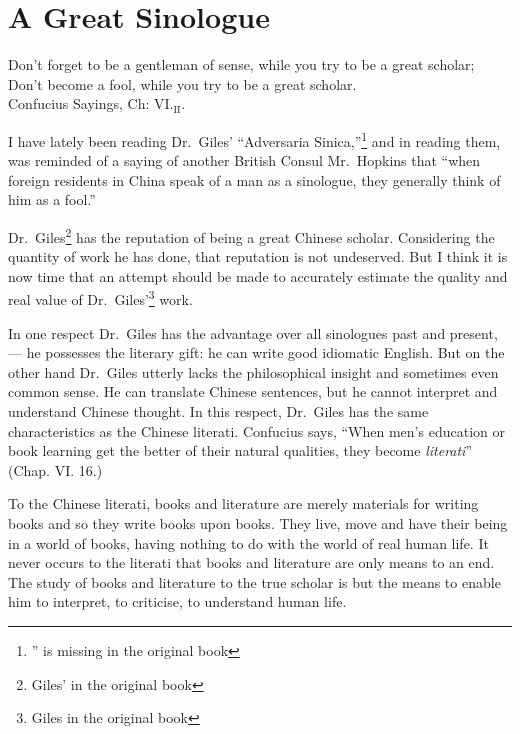 \chapter{A Great Sinologue}
\begin{center} \footnotesize 
    Don't forget to be a gentleman of sense, while you try to be a great scholar; \\ Don't become a fool, while you try to be a great scholar. \\
    \hfill Confucius Sayings, Ch: VI.$_{\text{II}}$. 
\end{center}
    \vspace{0.3cm}

    I have lately been reading Dr.~Giles' ``Adversaria Sinica,''\footnote{'' is missing in the original book} and in reading them, was reminded of a saying of another British Consul Mr.~Hopkins  that ``when foreign residents in China speak of a man as a sinologue, they generally think of him as a fool.''

Dr.~Giles\footnote{Giles' in the original book} has the reputation of being a great Chinese scholar.
Considering the quantity of work he has done, that reputation is not undeserved.
But I think it is now time that an attempt should be made to accurately estimate the quality and real value of Dr.~Giles'\footnote{Giles in the original book} work.

In one respect Dr.~Giles has the advantage over all sinologues past and present, --- he possesses the literary gift: he can write good idiomatic English.
But on the other hand Dr.~Giles utterly lacks the philosophical insight and sometimes even common sense.
He can translate Chinese sentences, but he cannot interpret and understand Chinese thought.
In this respect, Dr.~Giles has the same characteristics as the Chinese literati.
Confucius says, ``When men's education or book learning get the better of their natural qualities, they become \emph{literati}'' (Chap. VI. 16.)

To the Chinese literati, books and literature are merely materials for writing books and so they write books upon books.
They live, move and have their being in a world of books, having nothing to do with the world of real human life.
It never occurs to the literati that books and literature are only means to an end.
The study of books and literature to the true scholar is but the means to enable him to interpret, to criticise, to understand human life.

